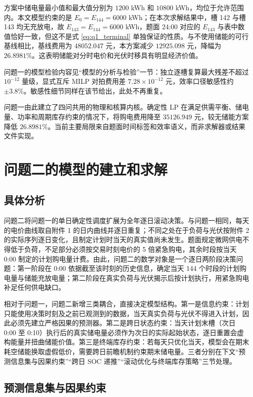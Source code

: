 \documentclass[withoutpreface,bwprint]{cumcmthesis}
\begin{document}
方案中储电量最小值和最大值分别为 $1200$ kWh 和 $10800$ kWh，均位于允许范围内。本文模型约束的是 $E_0=E_{144}=6000$ kWh；在本次求解结果中，槽 142 与槽 143 均无充放电，故 $E_{143}=E_{144}=6000$ kWh，题面 24:00 对应的 $E_{143}$ 与表中数值恰好一致，但这不是式 \eqref{eq:q1_terminal} 单独保证的性质。与不使用储能的可行基线相比，基线费用为 $48052.047$ 元，本方案减少 $12925.098$ 元，降幅为 $26.8981\%$。这表明储能对分时电价和光伏时移具有明显经济价值。

问题一的模型检验内容见“模型的分析与检验”一节：独立逐槽复算最大残差不超过 $10^{-12}$ 量级，显式互斥 MILP 对拍费用差 $7.28\times10^{-12}$ 元，效率口径敏感性约 $\pm3.8\%$。敏感性细节同样在该节给出，此处不再重复。

问题一由此建立了四问共用的物理和核算内核。确定性 LP 在满足供需平衡、储电量、功率和周期库存约束的情况下，将购电费用降至 $35126.949$ 元，较无储能方案降低 $26.8981\%$。当前主要局限来自题面时间标签和效率语义，而非求解器或结果文件实现。

\section{问题二的模型的建立和求解}
\subsection{具体分析}

问题二将问题一的单日确定性调度扩展为全年逐日滚动决策。与问题一相同，每天的电价曲线取自附件 1 的日内曲线并逐日重复；不同之处在于负荷与光伏按附件 2 的实际序列逐日变化，且制定计划时当天的真实值尚未发生。题面规定微网供电不得低于负荷，不足部分必须按交易时刻电价的 5 倍紧急购电，其余时段按当天 0:00 制定的计划购电量计费。由此，问题二的数学对象是一个逐日两阶段决策问题：第一阶段在 0:00 依据截至该时刻的历史信息，确定当天 144 个时段的计划购电量与储能充放电量；第二阶段在真实负荷与光伏揭示后按计划执行，用紧急购电补足任何供电缺口。

相对于问题一，问题二新增三类耦合，直接决定模型结构。第一是信息约束：计划只能使用决策时刻及之前已观测到的数据，当天真实负荷与光伏不得进入计划，因此必须先建立严格因果的预测器。第二是跨日状态约束：当天计划末槽（次日 0:00 至 0:10）执行后的真实储电量必须作为次日的实际起始状态，逐日重置会虚构能量并扭曲储能价值。第三是终端库存约束：若每天只优化当天，模型会在期末耗空储能换取虚假低价，需要跨日前瞻机制约束期末储电量。三者分别在下文“预测信息集与因果约束”“跨日 SOC 递推”“滚动优化与终端库存策略”三节处理。

\subsection{预测信息集与因果约束}
\end{document}

